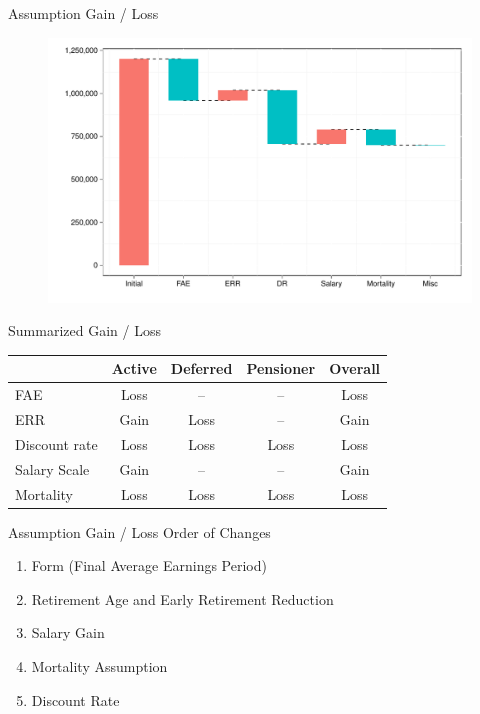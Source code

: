 \documentclass{beamer}
\begin{document}
\begin{frame}{Assumption Gain / Loss}

\begin{figure}
\includegraphics[width=1.0\textwidth]{waterfall2}
\end{figure}

\end{frame}

\begin{frame}{Summarized Gain / Loss}

\begin{table}[ht]
\begin{tabular}{l c c c c}
\hline
& Active & Deferred & Pensioner & Overall \\ \hline
FAE & Loss & -- & -- & Loss \\
ERR & Gain & Loss & -- & Gain \\
Discount rate & Loss & Loss & Loss & Loss \\ 
Salary Scale & Gain & -- & -- & Gain \\ 
Mortality & Loss & Loss  & Loss & Loss \\ \hline
\end{tabular}
\end{table}

\end{frame}

\begin{frame}{Assumption Gain / Loss Order of Changes}

\begin{enumerate}
\item Form (Final Average Earnings Period)
\item Retirement Age and Early Retirement Reduction
\item Salary Gain
\item Mortality Assumption
\item Discount Rate
\end{enumerate}

\end{frame}
\end{document}
